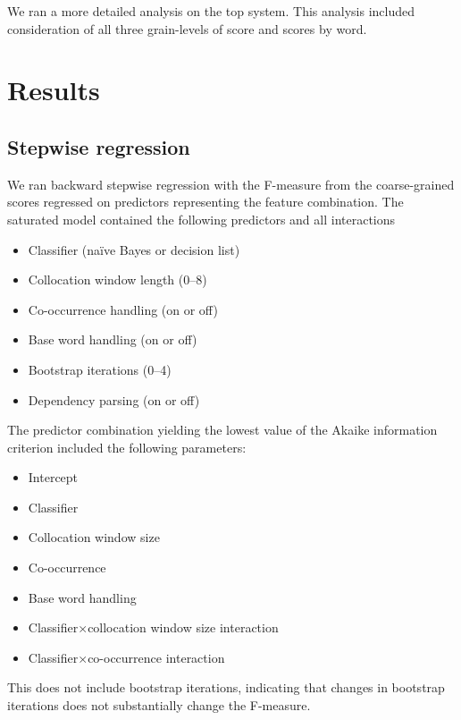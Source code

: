 \documentclass{article}
\newcommand{\naive}{na\"ive}
\begin{document}
We ran a more detailed analysis on the top system.  This analysis included
consideration of all three grain-levels of score and scores by word.

\section{Results}

\subsection{Stepwise regression}

We ran backward stepwise regression with the F-measure from the coarse-grained
scores regressed on predictors representing the feature combination.  The
saturated model contained the following predictors and all interactions

\begin{itemize}
\item Classifier (\naive{} Bayes or decision list)
\item Collocation window length (0--8)
\item Co-occurrence handling (on or off)
\item Base word handling (on or off)
\item Bootstrap iterations (0--4)
\item Dependency parsing (on or off)
\end{itemize}

The predictor combination yielding the lowest value of the Akaike information criterion
included the following parameters:

\begin{itemize}
\item Intercept
\item Classifier
\item Collocation window size
\item Co-occurrence
\item Base word handling
\item Classifier$\times$collocation window size interaction
\item Classifier$\times$co-occurrence interaction
\end{itemize}

This does not include bootstrap iterations, indicating that changes
in bootstrap iterations does not substantially change the F-measure.

\end{document}

